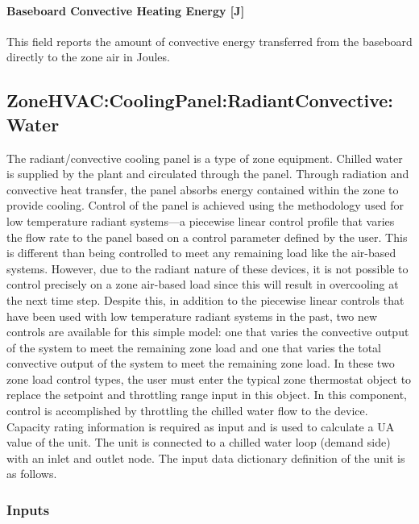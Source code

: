 \paragraph{Baseboard Convective Heating Energy {[}J{]}}\label{baseboard-convective-heating-energy-j-2}

This field reports the amount of convective energy transferred from the baseboard directly to the zone air in Joules.

\subsection{ZoneHVAC:CoolingPanel:RadiantConvective:Water}\label{zonehvaccoolingpanelradiantconvectivewater}

The radiant/convective cooling panel is a type of zone equipment.  Chilled water is supplied by the plant and circulated through the panel.  Through radiation and convective heat transfer, the panel absorbs energy contained within the zone to provide cooling.  Control of the panel is achieved using the methodology used for low temperature radiant systems—a piecewise linear control profile that varies the flow rate to the panel based on a control parameter defined by the user.  This is different than being controlled to meet any remaining load like the air-based systems.  However, due to the radiant nature of these devices, it is not possible to control precisely on a zone air-based load since this will result in overcooling at the next time step.  Despite this, in addition to the piecewise linear controls that have been used with low temperature radiant systems in the past, two new controls are available for this simple model: one that varies the convective output of the system to meet the remaining zone load and one that varies the total convective output of the system to meet the remaining zone load.  In these two zone load control types, the user must enter the typical zone thermostat object to replace the setpoint and throttling range input in this object.  In this component, control is accomplished by throttling the chilled water flow to the device.  Capacity rating information is required as input and is used to calculate a UA value of the unit. The unit is connected to a chilled water loop (demand side) with an inlet and outlet node. The input data dictionary definition of the unit is as follows.

\subsubsection{Inputs}\label{inputs-3-028-1}

